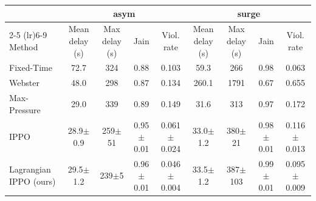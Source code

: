\begin{tabular}{lcccccccc}
\toprule
 & \multicolumn{4}{c}{asym} & \multicolumn{4}{c}{surge} \\
\cmidrule(lr){2-5} \cmidrule(lr){6-9}
Method & Mean delay (s) & Max delay (s) & Jain & Viol. rate & Mean delay (s) & Max delay (s) & Jain & Viol. rate \\
\midrule
Fixed-Time & 72.7 & 324 & 0.88 & 0.103 & 59.3 & 266 & 0.98 & 0.063 \\
Webster & 48.0 & 298 & 0.87 & 0.134 & 260.1 & 1791 & 0.67 & 0.655 \\
Max-Pressure & 29.0 & 339 & 0.89 & 0.149 & 31.6 & 313 & 0.97 & 0.172 \\
IPPO & 28.9\tiny{$\pm$0.9} & 259\tiny{$\pm$51} & 0.95\tiny{$\pm$0.01} & 0.061\tiny{$\pm$0.024} & 33.0\tiny{$\pm$1.2} & 380\tiny{$\pm$21} & 0.98\tiny{$\pm$0.01} & 0.116\tiny{$\pm$0.013} \\
Lagrangian IPPO (ours) & 29.5\tiny{$\pm$1.2} & 239\tiny{$\pm$5} & 0.96\tiny{$\pm$0.01} & 0.046\tiny{$\pm$0.004} & 33.5\tiny{$\pm$1.2} & 387\tiny{$\pm$103} & 0.99\tiny{$\pm$0.01} & 0.095\tiny{$\pm$0.009} \\
\bottomrule
\end{tabular}